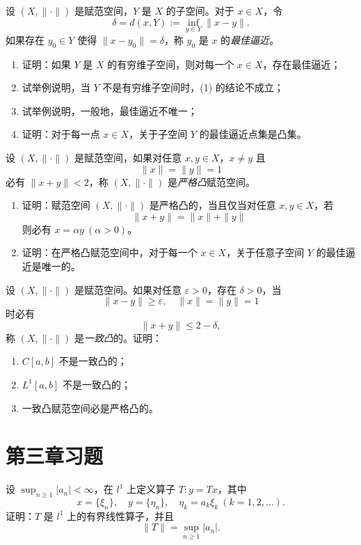 \begin{homework}[2.16]
设 $(X,\|\cdot\|)$ 是赋范空间，$Y$ 是 $X$ 的子空间。对于 $x\in X$，令
\[
\delta = d(x,Y) := \inf_{y\in Y} \|x-y\|.
\]
如果存在 $y_0\in Y$ 使得 $\|x-y_0\|=\delta$，称 $y_0$ 是 $x$ 的\emph{最佳逼近}。

\begin{enumerate}
  \item 证明：如果 $Y$ 是 $X$ 的有穷维子空间，则对每一个 $x\in X$，存在最佳逼近；
  \item 试举例说明，当 $Y$ 不是有穷维子空间时，(1) 的结论不成立；
  \item 试举例说明，一般地，最佳逼近不唯一；
  \item 证明：对于每一点 $x\in X$，关于子空间 $Y$ 的最佳逼近点集是凸集。
\end{enumerate}
\end{homework}
\begin{homework}[2.17]
设 $(X,\|\cdot\|)$ 是赋范空间，如果对任意 $x,y\in X$，$x\ne y$ 且
\[
\|x\|=\|y\|=1
\]
必有 $\|x+y\|<2$，称 $(X,\|\cdot\|)$ 是\emph{严格凸}赋范空间。

\begin{enumerate}
  \item 证明：赋范空间 $(X,\|\cdot\|)$ 是严格凸的，当且仅当对任意 $x,y\in X$，若
  \[
  \|x+y\|=\|x\|+\|y\|
  \]
  则必有 $x=\alpha y\ (\alpha>0)$。
  \item 证明：在严格凸赋范空间中，对于每一个 $x\in X$，关于任意子空间 $Y$ 的最佳逼近是唯一的。
\end{enumerate}
\end{homework}

\begin{homework}[2.18]
设 $(X,\|\cdot\|)$ 是赋范空间。如果对任意 $\varepsilon>0$，存在 $\delta>0$，当
\[
\|x-y\|\ge\varepsilon,\quad \|x\|=\|y\|=1
\]
时必有
\[
\|x+y\|\le 2-\delta,
\]
称 $(X,\|\cdot\|)$ 是\emph{一致凸}的。证明：
\begin{enumerate}
  \item $C[a,b]$ 不是一致凸的；
  \item $L^1[a,b]$ 不是一致凸的；
  \item 一致凸赋范空间必是严格凸的。
\end{enumerate}
\end{homework}
\section{第三章习题}
\begin{homework}[3.1]
设 $\sup_{n\ge1}|a_n|<\infty$，在 $l^{1}$ 上定义算子 $T:y=Tx$，其中
\[
x=\{\xi_n\},\quad y=\{\eta_n\},\quad \eta_k = a_k \xi_k\ (k=1,2,\dots).
\]
证明：$T$ 是 $l^{1}$ 上的有界线性算子，并且
\[
\|T\| = \sup_{n\ge1}|a_n|.
\]
\end{homework}

